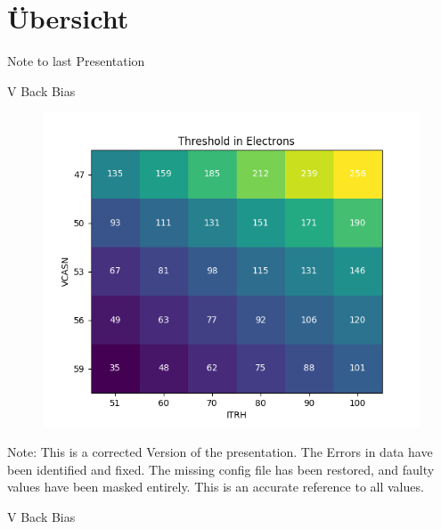 
\section{Übersicht}

\begin{frame}{Note to last Presentation}
    \begin{minipage}{.49\textwidth}
	 V Back Bias
    \begin{figure}[H]
	\centering
	\includegraphics[width=\textwidth]{bb0_Heatmap_corrected.png}
    \end{figure}
    \raggedright
    \tiny
    Note: This is a corrected Version of the presentation. The Errors in
    data have been identified and fixed. The
    missing config file has been restored, and faulty values have been
    masked entirely. This is an accurate reference to all values.
    \end{minipage}
    \begin{minipage}{.49\textwidth}
	 V Back Bias
    \begin{figure}[H]
	\centering

\end{figure}
\end{minipage}
\end{frame}

